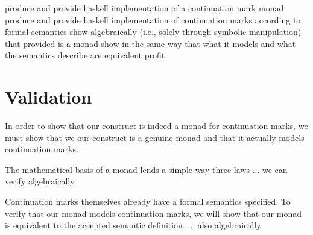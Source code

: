 \documentclass[ms]{byuprop}
\begin{document}
produce and provide haskell implementation of a continuation mark monad
produce and provide haskell implementation of continuation marks according to formal semantics
show algebraically (i.e., solely through symbolic manipulation) that provided is a monad
show in the same way that what it models and what the semantics describe are equivalent
profit

\section{Validation}


In order to show that our construct is indeed a monad for continuation marks, we must show that we our construct is a genuine monad and that it actually models continuation marks.

The mathematical basis of a monad lends a simple way three laws ... we can verify algebraically.

Continuation marks themselves already have a formal semantics specified. To verify that our monad models continuation marks, we will show that our monad is equivalent to the accepted semantic definition. ... also algebraically






\end{document}
